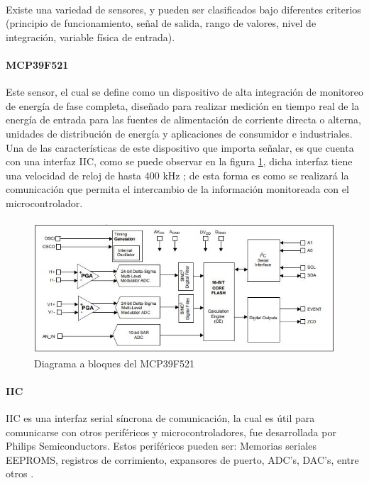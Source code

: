 \paragraph{}
Existe una variedad de sensores, y pueden ser clasificados bajo diferentes criterios (principio de funcionamiento, señal de salida, rango de valores, nivel de integración, variable física de entrada).

\paragraph{MCP39F521}
Este sensor, el cual se define como un dispositivo de alta integración de monitoreo de energía de fase completa, diseñado para realizar medición en tiempo real de la energía de entrada para las fuentes de alimentación de corriente directa o alterna, unidades de distribución de energía y aplicaciones de consumidor e industriales. Una de las características de este dispositivo que importa señalar, es que cuenta con una interfaz IIC, como se puede observar en la figura \ref{fig:Diagrama a bloques del MCP39F521}, dicha interfaz tiene una velocidad de reloj de hasta 400 kHz \citep{MarcoTeorico13}; de esta forma es como se realizará la comunicación que permita el intercambio de la información monitoreada con el microcontrolador. 
\paragraph{}
\begin{figure}[H]
	\centering
	\includegraphics[scale=.9]{Capitulo2/images/DiagramaDispMonitoreo.JPG}
	\caption{Diagrama a bloques del MCP39F521}
	\label{fig:Diagrama a bloques del MCP39F521}
\end{figure}

\paragraph{IIC}
IIC es una interfaz serial síncrona de comunicación, la cual es útil para comunicarse  con otros periféricos y microcontroladores, fue desarrollada por Philips Semiconductors.
Estos periféricos pueden ser: Memorias seriales EEPROMS, registros de corrimiento, expansores de puerto, ADC's, DAC's, entre otros \citep{MarcoTeorico17}.
